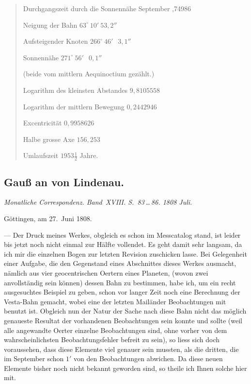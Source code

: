 \documentclass[12pt,a4paper]{book}
\begin{document}
\begin{quote}
Durchgangszeit durch die Sonnenn\"ahe September ,74986

Neigung der Bahn \dotfill $63^{\circ}\ 10'\ 53{,}2''$

Aufsteigender Knoten \dotfill $266^{\circ}\ 46'\ \phantom{0}3{,}1''$

Sonnenn\"ahe \dotfill $271^{\circ}\ 56'\ \phantom{0}0{,}1''$

(beide vom mittlern Aequinoctium gez\"ahlt.)

Logarithm des kleinsten Abstandes \dotfill $9{,}8105558$

Logarithm der mittlern Bewegung \dotfill $0{,}2442946$

Excentricit\"at \dotfill $0{,}9958626$

Halbe grosse Axe \dotfill $156{,}253$

Umlaufszeit \dotfill $1953\frac12$ Jahre.
\end{quote}


\newpage
\subsection*{Gau{\ss} an von Lindenau.}

\textit{Monatliche Correspondenz. Band~XVIII. S.~83\,\ldots\,86. 1808 Juli.}

G\"ottingen, am 27.~Juni 1808.

--- Der Druck meines Werkes, obgleich es schon im Messcatalog stand, ist leider bis jetzt noch nicht einmal zur H\"alfte vollendet. Es geht damit sehr langsam, da ich mir die einzelnen Bogen zur letzten Revision zuschicken lasse. Bei Gelegenheit einer Aufgabe, die den Gegenstand eines Abschnittes dieses Werkes ausmacht, n\"amlich aus vier geocentrischen Oertern eines Planeten, (wovon zwei anvollst\"andig sein k\"onnen) dessen Bahn zu bestimmen, habe ich, um ein recht ausgesuchtes Beispiel zu geben, schon vor langer Zeit noch eine Berechnung der Vesta-Bahn gemacht, wobei eine der letzten Mail\"ander Beobachtungen mit benutzt ist. Obgleich nun der Natur der Sache nach diese Bahn nicht das m\"oglich genaueste Resultat der vorhandenen Beobachtungen sein konnte und sollte (weil alle angewandte Oerter einzelne Beobachtungen sind, ohne vorher von dem wahrscheinlichsten Beobachtungsfehler befreit zu sein), so liess sich doch voraussehen, dass diese Elemente viel genauer sein mussten, als die dritten, die im September schon $1'$ von den Beobachtungen abwichen. Da diese neuen Elemente bisher noch nicht bekannt geworden sind, so theile ich Ihnen solche hier mit.
\end{document}
